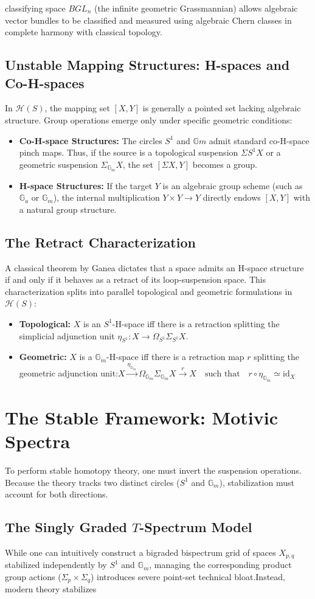 \documentclass[11pt,oneside]{article}
\begin{document}
classifying space $BGL_n$ (the infinite geometric Grassmannian) allows algebraic vector bundles to be classified and measured using algebraic Chern classes in complete harmony with classical topology.\subsection{Unstable Mapping Structures: H-spaces and Co-H-spaces}In $\mathcal{H}(S)$, the mapping set $[X,Y]$ is generally a pointed set lacking algebraic structure. Group operations emerge only under specific geometric conditions:\begin{itemize}\item \textbf{Co-H-space Structures:} The circles $S^1$ and $\mathbb{G}m$ admit standard co-H-space pinch maps. Thus, if the source is a topological suspension $\Sigma{S^1}X$ or a geometric suspension $\Sigma_{\mathbb{G}_m}X$, the set $[\Sigma X, Y]$ becomes a group.\item \textbf{H-space Structures:} If the target $Y$ is an algebraic group scheme (such as $\mathbb{G}_a$ or $\mathbb{G}_m$), the internal multiplication $Y \times Y \to Y$ directly endows $[X,Y]$ with a natural group structure.\end{itemize}\subsection{The Retract Characterization}A classical theorem by Ganea dictates that a space admits an H-space structure if and only if it behaves as a retract of its loop-suspension space. This characterization splits into parallel topological and geometric formulations in $\mathcal{H}(S)$:\begin{itemize}\item \textbf{Topological:} $X$ is an $S^1$-H-space iff there is a retraction splitting the simplicial adjunction unit $\eta_{S^1}: X \to \Omega_{S^1}\Sigma_{S^1}X$.\item \textbf{Geometric:} $X$ is a $\mathbb{G}_m$-H-space iff there is a retraction map $r$ splitting the geometric adjunction unit:\(X\xrightarrow{\eta _{\mathbb{G}_{m}}}\Omega _{\mathbb{G}_{m}}\Sigma _{\mathbb{G}_{m}}X\xrightarrow{r}X\quad \text{such\ that}\quad r\circ \eta _{\mathbb{G}_{m}}\simeq \text{id}_{X}\)\end{itemize}\section{The Stable Framework: Motivic Spectra}To perform stable homotopy theory, one must invert the suspension operations. Because the theory tracks two distinct circles ($S^1$ and $\mathbb{G}_m$), stabilization must account for both directions.\subsection{The Singly Graded $T$-Spectrum Model}While one can intuitively construct a bigraded bispectrum grid of spaces $X_{p,q}$ stabilized independently by $S^1$ and $\mathbb{G}_m$, managing the corresponding product group actions ($\Sigma_p \times \Sigma_q$) introduces severe point-set technical bloat.Instead, modern theory stabilizes 
\end{document}
